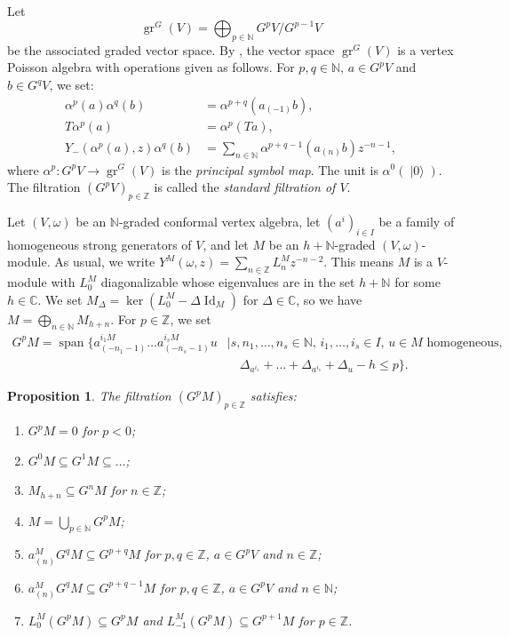 \documentclass[a4paper, 12pt, reqno]{amsart}
\newtheorem{proposition}[theorem]{Proposition}
\theoremstyle{remark}
\DeclareMathOperator{\Id}{Id}
\DeclareMathOperator{\gr}{gr}
\DeclareMathOperator{\vspan}{span}
\DeclareMathOperator{\vac}{|0\rangle}
\begin{document}
Let
\begin{equation*}
  \gr^G(V) = \bigoplus_{p \in \mathbb{N}}G^pV/G^{p - 1}V
\end{equation*}
be the associated graded vector space.
By \cite{li_vertex_2004}, the vector space $\gr^G(V)$ is a vertex Poisson algebra with operations given as follows.
For $p, q \in \mathbb{N}$, $a \in G^pV$ and $b \in G^qV$, we set:
\begin{align*}
  \alpha^p(a)\alpha^q(b) &= \alpha^{p + q}(a_{(-1)}b), \\
  T\alpha^p(a) &= \alpha^p(Ta), \\
  Y_-(\alpha^p(a), z)\alpha^q(b) &= \sum_{n \in \mathbb{N}}\alpha^{p + q - 1}(a_{(n)}b)z^{-n - 1},
\end{align*}
where $\alpha^p: G^pV \to \gr^G(V)$ is the \emph{principal symbol map}.
The unit is $\alpha^0(\vac)$.
The filtration $(G^pV)_{p \in \mathbb{Z}}$ is called the \emph{standard filtration of $V$}.

Let $(V, \omega)$ be an $\mathbb{N}$-graded conformal vertex algebra, let $(a^i)_{i \in I}$ be a family of homogeneous strong generators of $V$, and let $M$ be an $h + \mathbb{N}$-graded $(V, \omega)$-module.
As usual, we write $Y^M(\omega, z) = \sum_{n \in \mathbb{Z}}L^M_nz^{-n - 2}$.
This means $M$ is a $V$-module with $L_0^M$ diagonalizable whose eigenvalues are in the set $h + \mathbb{N}$ for some $h \in \mathbb{C}$.
We set $M_{\Delta} = \ker(L^M_0 - \Delta\Id_M)$ for $\Delta \in \mathbb{C}$, so we have $M = \bigoplus_{n \in \mathbb{N}}M_{h + n}$.
For $p \in \mathbb{Z}$, we set
\begin{equation*}
  \begin{split}
    G^pM = \vspan\{a^{i_1M}_{(-n_1 - 1)}\dots a^{i_sM}_{(-n_s - 1)}u &\mid \text{$s, n_1, \dots, n_s \in \mathbb{N}$, $i_1, \dots, i_s \in I$, $u \in M$ homogeneous,} \\
                                                                     &\quad \Delta_{a^{i_1}} + \dots + \Delta_{a^{i_s}} + \Delta_u - h \le p\}.
  \end{split}
\end{equation*}

\begin{proposition}
  \label{prp:2}
  The filtration $(G^pM)_{p \in \mathbb{Z}}$ satisfies:
  \begin{enumerate}
  \item $G^pM = 0$ for $p < 0$;
  \item $G^0M \subseteq G^1M \subseteq \dots$;
  \item $M_{h + n} \subseteq G^nM$ for $n \in \mathbb{Z}$;
  \item $M = \bigcup_{p \in \mathbb{N}}G^pM$;
  \item $a^M_{(n)}G^qM \subseteq G^{p + q}M$ for $p, q \in \mathbb{Z}$, $a \in G^pV$ and $n \in \mathbb{Z}$;
  \item $a^M_{(n)}G^qM \subseteq G^{p + q - 1}M$ for $p, q \in \mathbb{Z}$, $a \in G^pV$ and $n \in \mathbb{N}$;
  \item $L^M_0(G^pM) \subseteq G^pM$ and $L^M_{-1}(G^pM) \subseteq G^{p + 1}M$ for $p \in \mathbb{Z}$.
  \end{enumerate}
\end{proposition}
\end{document}
